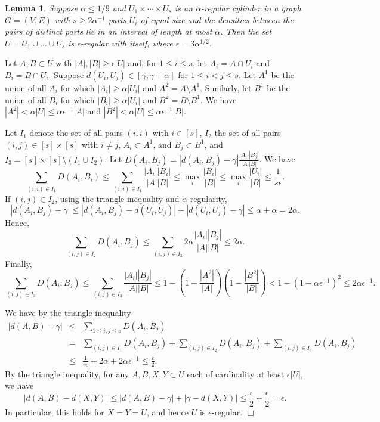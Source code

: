 \documentclass[11pt]{article}
\newtheorem{lemma}{Lemma}[section]
\newenvironment{proof}
      {\medskip\noindent{\bf Proof:}\hspace{1mm}}
      {\hfill$\Box$\medskip}
\begin{document}
\begin{lemma}\label{sunioncyl}
Suppose $\alpha \leq 1/9$ and $U_1 \times \cdots \times U_s$ is an
$\alpha$-regular cylinder in a graph $G=(V,E)$ with $s \geq 2\alpha^{-1}$
parts $U_i$ of equal size and the densities between the pairs of distinct parts
lie in an interval of length at most $\alpha$. Then the set $U=U_1 \cup \ldots
\cup U_s$ is $\epsilon$-regular with itself, where $\epsilon=3\alpha^{1/2}$.
\end{lemma}
\begin{proof}
Let $A,B \subset U$ with $|A|,|B| \geq \epsilon|U|$ and, for $1 \leq i \leq s$,
let $A_i=A \cap U_i$ and $B_i=B \cap U_i$.
Suppose $d(U_i,U_j) \in [\gamma,\gamma+\alpha]$ for $1 \leq i < j \leq s$. Let
$A^1$ be the union of all $A_i$ for which $|A_i| \geq \alpha|U_i|$ and $A^2=A \setminus A^1$. Similarly, let
$B^1$ be the union of all $B_i$ for which $|B_i| \geq \alpha|U_i|$ and $B^2=B \setminus B^1$. We have
$|A^2| < \alpha|U| \leq \alpha \epsilon^{-1}|A|$ and $|B^2| < \alpha|U| \leq
\alpha \epsilon^{-1}|B|$.

Let $I_1$ denote the set of all pairs $(i,i)$ with $i \in [s]$, $I_2$ the set
of all pairs $(i,j) \in [s] \times [s]$ with $i \not = j$, $A_i \subset A^1$, and
$B_j \subset B^1$, and $I_3=[s] \times [s] \setminus (I_1 \cup I_2)$. Let
$D(A_i,B_j)=\left|d(A_i,B_j)-\gamma\right|\frac{|A_i||B_j|}{|A||B|}$. We have
$$\sum_{(i,i) \in I_1} D(A_i,B_i) \leq \sum_{(i,i) \in I_1}
\frac{|A_i||B_i|}{|A||B|} \leq \max_i \frac{|B_i|}{|B|} \leq \max_i
\frac{|U_i|}{|B|} \leq \frac{1}{s\epsilon}.$$
If $(i,j) \in I_2$, using the triangle inequality and $\alpha$-regularity,
$$|d(A_i,B_j)-\gamma| \leq |d(A_i,B_j)-d(U_i,U_j)|+|d(U_i,U_j)-\gamma| \leq
\alpha+\alpha=2\alpha.$$
Hence, $$\sum_{(i,j) \in I_2} D(A_i,B_j) \leq \sum_{(i,j) \in I_2}
2\alpha\frac{|A_i||B_j|}{|A||B|} \leq 2\alpha.$$
Finally, $$\sum_{(i,j) \in I_3} D(A_i,B_j) \leq \sum_{(i,j) \in I_3}
\frac{|A_i||B_j|}{|A||B|} \leq
1-\left(1-\frac{|A^2|}{|A|}\right)\left(1-\frac{|B^2|}{|B|}\right)<1-(1-\alpha\epsilon^{-1})^2
\leq 2\alpha\epsilon^{-1}.$$

We have by the triangle inequality \begin{eqnarray*} \left|d(A,B)-\gamma\right|
& \leq & \sum_{1 \leq i,j \leq s}D(A_i,B_j) \\ &
= &   \sum_{(i,j) \in I_1}D(A_i,B_j)+\sum_{(i,j) \in I_2}D(A_i,B_j)+\sum_{(i,j)
\in I_3}D(A_i,B_j) \\ & \leq & \frac{1}{s\epsilon}+2\alpha+2\alpha\epsilon^{-1}
\leq \frac{\epsilon}{2}.
\end{eqnarray*}
By the triangle inequality, for any $A,B,X,Y \subset U$ each of cardinality at
least $\epsilon|U|$, we have $$\left|d(A,B)-d(X,Y)\right|\leq
\left|d(A,B)-\gamma\right|+\left|\gamma-d(X,Y)\right| \leq
\frac{\epsilon}{2}+\frac{\epsilon}{2}=\epsilon.$$ In particular, this holds for
$X=Y=U$, and hence $U$ is $\epsilon$-regular.
\end{proof}
\end{document}
